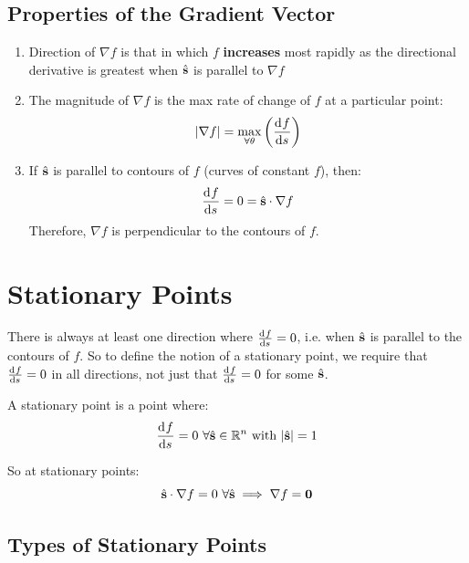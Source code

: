 \documentclass[../main.tex]{subfiles}
\begin{document}
\subsection{Properties of the Gradient Vector}
\begin{enumerate}
  \item Direction of $\nabla f$ is that in which $f$ \textbf{increases} most rapidly as the directional derivative is greatest when $\hat{\mathbf{\bm{s}}}$ is parallel to $\nabla f$
  \item The magnitude of $\nabla f$ is the max rate of change of $f$ at a particular point:
    \[
      |\nabla f| = \max_{\forall \theta}\left(\deriv{f}{s}\right)
    \]
  \item If $\hat{\mathbf{\bm{s}}}$ is parallel to contours of $f$ (curves of constant $f$), then:
    \[
      \deriv{f}{s} = 0 = \uvec{s} \cdot \nabla f
    \]
    Therefore, $\nabla f$ is perpendicular to the contours of $f$.
\end{enumerate}
\section{Stationary Points}
There is always at least one direction where $\deriv{f}{s} = 0$, i.e. when $\hat{\mathbf{\bm{s}}}$ is parallel to the contours of $f$.
So to define the notion of a stationary point, we require that $\deriv{f}{s} = 0$ in all directions, not just that $\deriv{f}{s} = 0$ for some $\hat{\mathbf{\bm{s}}}$.
\begin{definition}
  A stationary point is a point where:
  \[
    \deriv{f}{s} = 0\ \forall \uvec{s} \in \R^{n} \text{ with } |\uvec{s}| = 1
  \]
\end{definition}
So at stationary points:
\[
  \hat{\mathbf{\bm{s}}} \cdot \nabla f = 0\ \forall \hat{\mathbf{\bm{s}}} \implies \nabla f = \mathbf{\bm{0}}
\]
\subsection{Types of Stationary Points}
\label{typesOfStationary}
\end{document}
